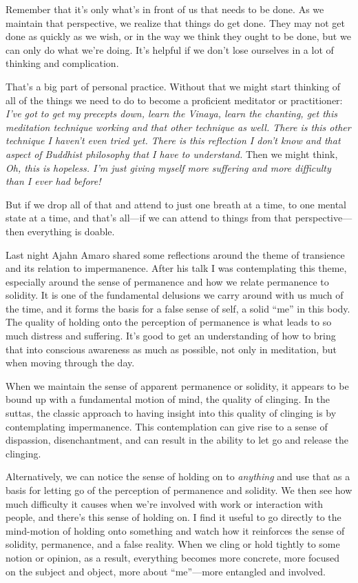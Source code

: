 Remember that it's only what's in front of us that needs to be done. As 
we maintain that perspective, we realize that things do get done. They 
may not get done as quickly as we wish, or in the way we think they 
ought to be done, but we can only do what we're doing. It's helpful if 
we don't lose ourselves in a lot of thinking and complication.

That's a big part of personal practice. Without that we might start 
thinking of all of the things we need to do to become a proficient 
meditator or practitioner: \emph{I've got to get my precepts down, 
learn the Vinaya, learn the chanting, get this meditation technique 
working and that other technique as well. There is this other technique 
I haven't even tried yet. There is this reflection I don't know and 
that aspect of Buddhist philosophy that I have to understand.} Then we 
might think, \emph{Oh, this is hopeless. I'm just giving myself more 
suffering and more difficulty than I ever had before!}

But if we drop all of that and attend to just one breath at a time, to 
one mental state at a time, and that's all---if we can attend to things 
from that perspective---then everything is doable.


Last night Ajahn Amaro shared some reflections around the theme of 
transience and its relation to impermanence. After his talk I was 
contemplating this theme, especially around the sense of permanence and 
how we relate permanence to solidity. It is one of the fundamental 
delusions we carry around with us much of the time, and it forms the 
basis for a false sense of self, a solid ``me'' in this body. The 
quality of holding onto the perception of permanence is what leads to 
so much distress and suffering. It's good to get an understanding of 
how to bring that into conscious awareness as much as possible, not 
only in meditation, but when moving through the day.

When we maintain the sense of apparent permanence or solidity, it 
appears to be bound up with a fundamental motion of mind, the quality 
of clinging. In the suttas, the classic approach to having insight into 
this quality of clinging is by contemplating impermanence. This 
contemplation can give rise to a sense of dispassion, disenchantment, 
and can result in the ability to let go and release the clinging.

Alternatively, we can notice the sense of holding on to \emph{anything} 
and use that as a basis for letting go of the perception of permanence 
and solidity. We then see how much difficulty it causes when we're 
involved with work or interaction with people, and there's this sense 
of holding on. I find it useful to go directly to the mind-motion of 
holding onto something and watch how it reinforces the sense of 
solidity, permanence, and a false reality. When we cling or hold 
tightly to some notion or opinion, as a result, everything becomes more 
concrete, more focused on the subject and object, more about 
``me''---more entangled and involved.

